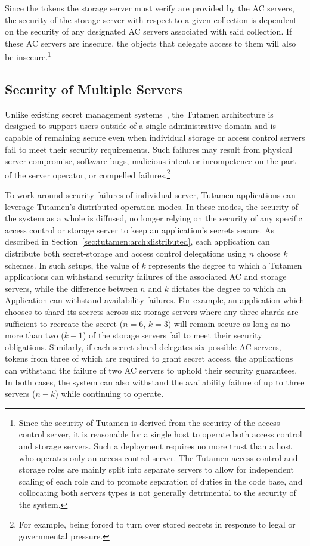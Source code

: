 Since the tokens the storage server must verify are provided by the AC
servers, the security of the storage server with respect to a given
collection is dependent on the security of any designated AC servers
associated with said collection. If these AC servers are insecure, the
objects that delegate access to them will also be
insecure.\footnote{Since the security of Tutamen is derived from the
  security of the access control server, it is reasonable for a single
  host to operate both access control and storage servers. Such a
  deployment requires no more trust than a host who operates only an
  access control server. The Tutamen access control and storage roles
  are mainly split into separate servers to allow for independent
  scaling of each role and to promote separation of duties in the code
  base, and collocating both servers types is not generally
  detrimental to the security of the system.}

\subsection{Security of Multiple Servers}

Unlike existing secret management systems~\cite{vault, confidant,
  keywhiz}, the Tutamen architecture is designed to support users
outside of a single administrative domain and is capable of remaining
secure even when individual storage or access control servers fail to
meet their security requirements. Such failures may result from
physical server compromise, software bugs, malicious intent or
incompetence on the part of the server operator, or compelled
failures.\footnote{For example, being forced to turn over stored
  secrets in response to legal or governmental pressure.}

To work around security failures of individual server, Tutamen
applications can leverage Tutamen's distributed operation modes. In
these modes, the security of the system as a whole is diffused, no
longer relying on the security of any specific access control or
storage server to keep an application's secrets secure. As described
in Section~\ref{sec:tutamen:arch:distributed}, each application can
distribute both secret-storage and access control delegations using
$n$ choose $k$ schemes. In such setups, the value of $k$ represents
the degree to which a Tutamen applications can withstand security
failures of the associated AC and storage servers, while the
difference between $n$ and $k$ dictates the degree to which an
Application can withstand availability failures. For example, an
application which chooses to shard its secrets across six storage
servers where any three shards are sufficient to recreate the secret
($n=6$, $k=3$) will remain secure as long as no more than two ($k-1$)
of the storage servers fail to meet their security
obligations. Similarly, if each secret shard delegates six possible AC
servers, tokens from three of which are required to grant secret
access, the applications can withstand the failure of two AC servers
to uphold their security guarantees. In both cases, the system can
also withstand the availability failure of up to three servers ($n-k$)
while continuing to operate.

